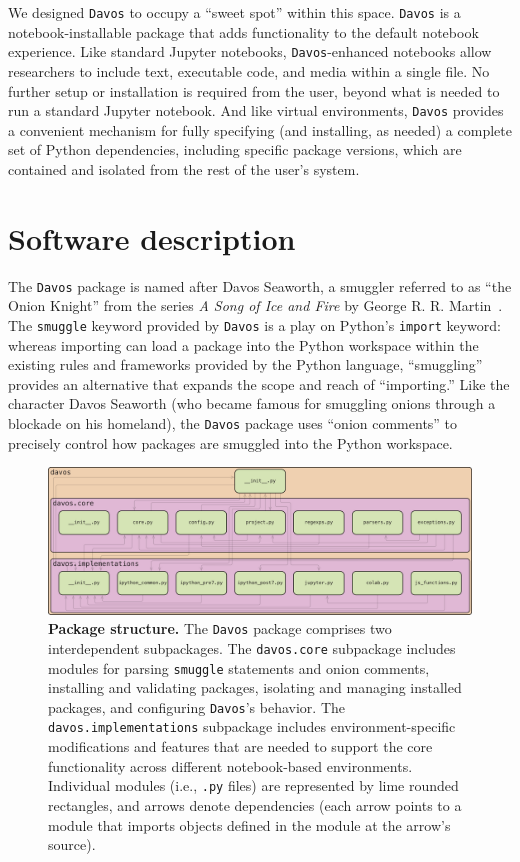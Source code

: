 \documentclass[preprint,12pt,a4paper]{elsarticle}
\begin{document}
We designed \texttt{Davos} to occupy a ``sweet spot'' within this space.
\texttt{Davos} is a notebook-installable package that adds functionality to the
default notebook experience. Like standard Jupyter notebooks,
\texttt{Davos}-enhanced notebooks allow researchers to include text, executable
code, and media within a single file. No further setup or installation is
required from the user, beyond what is needed to run a standard Jupyter
notebook. And like virtual environments, \texttt{Davos} provides a convenient
mechanism for fully specifying (and installing, as needed) a complete set of
Python dependencies, including specific package versions, which are contained
and isolated from the rest of the user's system.


\section{Software description}

The \texttt{Davos} package is named after Davos Seaworth, a smuggler referred
to as ``the Onion Knight'' from the series \textit{A Song of Ice and Fire} by
George R. R. Martin~\cite{Mart98}. The \texttt{smuggle} keyword provided by
\texttt{Davos} is a play on Python's \texttt{import} keyword: whereas importing
can load a package into the Python workspace within the existing rules and
frameworks provided by the Python language, ``smuggling'' provides an
alternative that expands the scope and reach of ``importing.'' Like the
character Davos Seaworth (who became famous for smuggling onions through a
blockade on his homeland), the \texttt{Davos} package uses ``onion comments'' to precisely control how
packages are smuggled into the Python workspace.

\begin{figure}[tp]
\centering
\includegraphics[width=\textwidth]{figs/package_structure}
\caption{\small \textbf{Package structure.} The \texttt{Davos} package
  comprises two interdependent subpackages. The \texttt{davos.core}
  subpackage includes modules for parsing \texttt{smuggle} statements
  and onion comments, installing and validating packages, isolating and managing
  installed packages, and configuring \texttt{Davos}'s behavior. The
  \texttt{davos.implementations} subpackage includes
  environment-specific modifications and features that are needed to
  support the core functionality across different notebook-based
  environments. Individual modules (i.e., \texttt{.py} files) are represented by lime
  rounded rectangles, and arrows denote dependencies (each arrow
  points to a module that imports objects defined in the module at the
  arrow's source).}
\label{fig:package-structure}
\end{figure}
\end{document}
